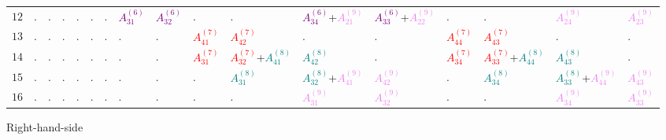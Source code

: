 \documentclass[times,namecite]{goose-article}
\begin{document}
\begin{landscape}
{\begin{tabular}{|c|C{31mm}C{31mm}C{31mm}C{31mm}C{31mm}C{31mm}C{31mm}C{31mm}C{31mm}C{31mm}C{31mm}C{31mm}C{31mm}C{31mm}C{31mm}C{31mm}|}
$12 $& . & . & . & . & . & . & \textcolor{purple}{$A_{31}^{(6)}$} & \textcolor{purple}{$A_{32}^{(6)}$} & . & . & \textcolor{purple}{$A_{34}^{(6)}$}+\textcolor{violet}{$A_{21}^{(9)}$} & \textcolor{purple}{$A_{33}^{(6)}$}+\textcolor{violet}{$A_{22}^{(9)}$} & . & . & \textcolor{violet}{$A_{24}^{(9)}$} & \textcolor{violet}{$A_{23}^{(9)}$} \\
$13 $& . & . & . & . & . & . & . & . & \textcolor{red}{$A_{41}^{(7)}$} & \textcolor{red}{$A_{42}^{(7)}$} & . & . & \textcolor{red}{$A_{44}^{(7)}$} & \textcolor{red}{$A_{43}^{(7)}$} & . & . \\
$14 $& . & . & . & . & . & . & . & . & \textcolor{red}{$A_{31}^{(7)}$} & \textcolor{red}{$A_{32}^{(7)}$}+\textcolor{teal}{$A_{41}^{(8)}$} & \textcolor{teal}{$A_{42}^{(8)}$} & . & \textcolor{red}{$A_{34}^{(7)}$} & \textcolor{red}{$A_{33}^{(7)}$}+\textcolor{teal}{$A_{44}^{(8)}$} & \textcolor{teal}{$A_{43}^{(8)}$} & . \\
$15 $& . & . & . & . & . & . & . & . & . & \textcolor{teal}{$A_{31}^{(8)}$} & \textcolor{teal}{$A_{32}^{(8)}$}+\textcolor{violet}{$A_{41}^{(9)}$} & \textcolor{violet}{$A_{42}^{(9)}$} & . & \textcolor{teal}{$A_{34}^{(8)}$} & \textcolor{teal}{$A_{33}^{(8)}$}+\textcolor{violet}{$A_{44}^{(9)}$} & \textcolor{violet}{$A_{43}^{(9)}$} \\
$16 $& . & . & . & . & . & . & . & . & . & . & \textcolor{violet}{$A_{31}^{(9)}$} & \textcolor{violet}{$A_{32}^{(9)}$} & . & . & \textcolor{violet}{$A_{34}^{(9)}$} & \textcolor{violet}{$A_{33}^{(9)}$} \\ \hline
\end{tabular}
}

\begin{center}
Right-hand-side
\end{center}


\end{landscape}
\end{document}
